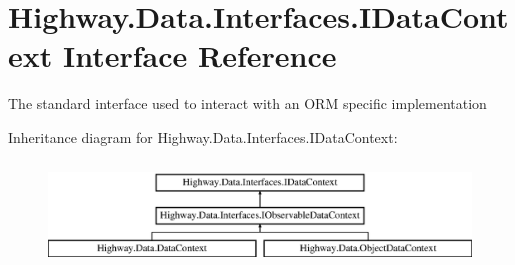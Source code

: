 \hypertarget{interface_highway_1_1_data_1_1_interfaces_1_1_i_data_context}{\section{Highway.\-Data.\-Interfaces.\-I\-Data\-Context Interface Reference}
\label{interface_highway_1_1_data_1_1_interfaces_1_1_i_data_context}
}


The standard interface used to interact with an O\-R\-M specific implementation  


Inheritance diagram for Highway.\-Data.\-Interfaces.\-I\-Data\-Context\-:\begin{figure}[H]
\begin{center}
\leavevmode
\includegraphics[height=2.800000cm]{interface_highway_1_1_data_1_1_interfaces_1_1_i_data_context}
\end{center}
\end{figure}
